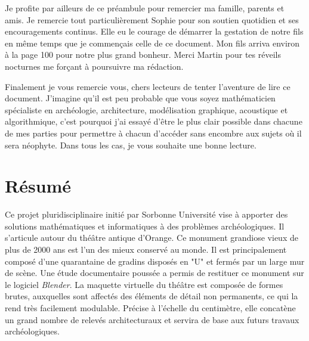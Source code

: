 Je profite par ailleurs de ce préambule pour remercier ma famille, parents et amis. Je remercie tout particulièrement Sophie pour son soutien quotidien et ses encouragements continus. Elle eu le courage de démarrer la gestation de notre fils en même temps que je commençais celle de ce document. Mon fils arriva environ à la page 100 pour notre plus grand bonheur. Merci Martin pour tes réveils nocturnes me forçant à poursuivre ma rédaction.

Finalement je vous remercie vous, chers lecteurs de tenter l'aventure de lire ce document. J'imagine qu'il est peu probable que vous soyez mathématicien spécialiste en archéologie, architecture, modélisation graphique, acoustique et algorithmique, c'est pourquoi j'ai essayé d'être le plus clair possible dans chacune de mes parties pour permettre à chacun d'accéder sans encombre aux sujets où il sera néophyte. Dans tous les cas, je vous souhaite une bonne lecture.


\newpage
\chapter*{Résumé}
Ce projet pluridisciplinaire initié par Sorbonne Université vise à apporter des solutions mathématiques et informatiques à des problèmes archéologiques. Il s'articule autour du théâtre antique d'Orange. Ce monument grandiose vieux de plus de 2000 ans est l'un des mieux conservé au monde. Il est principalement composé d'une quarantaine de gradins disposés en "U" et fermés par un large mur de scène. Une étude documentaire poussée a permis de restituer ce monument sur le logiciel \textit{Blender}. La maquette virtuelle du théâtre est composée de formes brutes, auxquelles sont affectés des éléments de détail non permanents, ce qui la rend très facilement modulable. Précise à l'échelle du centimètre, elle concatène un grand nombre de relevés architecturaux et servira de base aux futurs travaux archéologiques.

